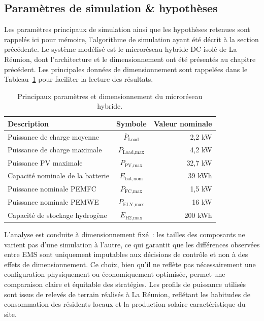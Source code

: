 \subsection{Paramètres de simulation \& hypothèses}

Les paramètres principaux de simulation ainsi que les hypothèses retenues sont rappelés ici pour mémoire, l'algorithme de simulation ayant été décrit à la section précédente. Le système modélisé est le microréseau hybride DC isolé de La Réunion, dont l'architecture et le dimensionnement ont été présentés au chapitre précédent. Les principales données de dimensionnement sont rappelées dans le Tableau~\ref{tab:system_parameters} pour faciliter la lecture des résultats.

\begin{table}[h!]
    \centering
    \caption{Principaux paramètres et dimensionnement du microréseau hybride.}
    \label{tab:system_parameters}
    \begin{tabular}{lcr}
        \hline
        Description & Symbole & Valeur nominale \\
        \hline
        Puissance de charge moyenne         & $\overline{P}_{\text{Load}}$  & 2,2 kW  \\
        Puissance de charge maximale        & $P_{\text{Load,max}}$         & 4,2 kW  \\
        Puissance PV maximale               & $P_{\text{PV,max}}$           & 32,7 kW \\
        Capacité nominale de la batterie    & $E_{\text{bat,nom}}$          & 39 kWh  \\
        Puissance nominale PEMFC            & $P_{\text{FC,max}}$           & 1,5 kW  \\
        Puissance nominale PEMWE            & $P_{\text{ELY,max}}$          & 16 kW   \\
        Capacité de stockage hydrogène      & $E_{\text{H2,max}}$           & 200 kWh \\
        \hline
    \end{tabular}
\end{table}

L'analyse est conduite à dimensionnement fixé~: les tailles des composants ne varient pas d'une simulation à l'autre, ce qui garantit que les différences observées entre EMS sont uniquement imputables aux décisions de contrôle et non à des effets de dimensionnement. Ce choix, bien qu'il ne reflète pas nécessairement une configuration physiquement ou économiquement optimisée, permet une comparaison claire et équitable des stratégies. Les profils de puissance utilisés sont issus de relevés de terrain réalisés à La Réunion, reflétant les habitudes de consommation des résidents locaux et la production solaire caractéristique du site.

